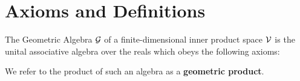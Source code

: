 %
%
%
%
%

\section{Axioms and Definitions}\label{s:axioms-definitions}

The Geometric Algebra $\mathcal{G}$ of a finite-dimensional inner product space $\mathcal{V}$ is the unital associative algebra over the reals which obeys the following axioms:

We refer to the product of such an algebra as a \textbf{geometric product}.



